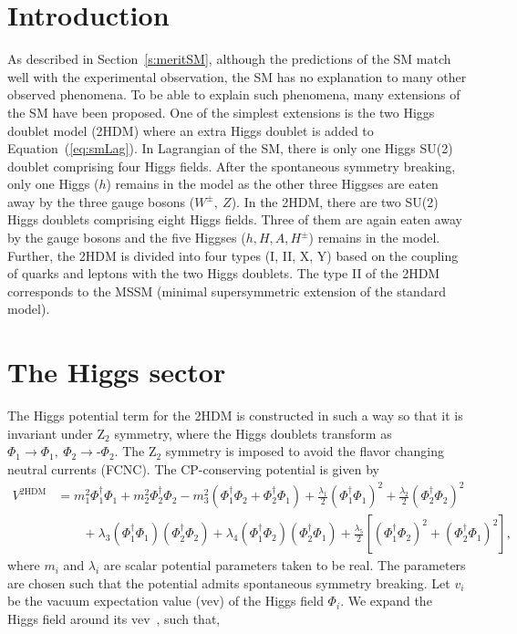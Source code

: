 
\section{Introduction}
\label{s:secIntro2HDM}
As described in Section~\ref{s:meritSM}, although the predictions of the SM 
match well with the experimental observation, the SM has no explanation
to many other observed phenomena. To be able to explain such phenomena, 
many extensions of the SM have been proposed. One of the simplest
extensions is the two Higgs doublet model (2HDM) where an extra Higgs doublet is
added to Equation~(\ref{eq:smLag}). In Lagrangian of the SM, there is only one Higgs SU(2) 
doublet comprising four Higgs fields. After the spontaneous symmetry breaking, 
only one Higgs ($h$) remains in the model as the other three Higgses are eaten 
away by the three gauge bosons ($W^\pm, ~Z$). In the 2HDM, there are two SU(2) 
Higgs doublets comprising eight Higgs fields. Three of them are again 
eaten away by the gauge bosons and the five Higgses ($h, H, A, H^\pm$) remains 
in the model. Further, the 2HDM is divided into four types (I, II, X, Y) based 
on the coupling of quarks and leptons with the two Higgs doublets. The type II
of the 2HDM corresponds to the MSSM (minimal supersymmetric extension of the 
standard model).

\section{The Higgs sector}
The Higgs potential term for the 2HDM is constructed in such a way so that it is 
invariant under Z$_2$ symmetry, where the Higgs doublets transform as 
$\Phi_1 \rightarrow \Phi_1, ~ \Phi_2 \rightarrow \text{-} \Phi_2$. The Z$_2$ symmetry
is imposed to avoid the flavor changing neutral currents (FCNC). The CP-conserving 
potential is given by \cite{PhysRevD.80.015017}
\begin{align}
V^\text{2HDM}
&= m_1^2\Phi_1^\dag\Phi_1+m_2^2\Phi_2^\dag\Phi_2
-m_3^2\left(\Phi_1^\dag\Phi_2+\Phi_2^\dag\Phi_1\right)
+\frac{\lambda_1}2(\Phi_1^\dag\Phi_1)^2
+\frac{\lambda_2}2(\Phi_2^\dag\Phi_2)^2\nonumber \\
&\qquad+\lambda_3(\Phi_1^\dag\Phi_1)(\Phi_2^\dag\Phi_2)
+\lambda_4(\Phi_1^\dag\Phi_2)(\Phi_2^\dag\Phi_1)
+\frac{\lambda_5}2\left[(\Phi_1^\dag\Phi_2)^2
+(\Phi_2^\dag\Phi_1)^2\right], 
\label{eq:pot2HDM}
\end{align}
where $m_i$ and $\lambda_i$ are scalar potential parameters taken to be real. 
The parameters are chosen such that the potential admits spontaneous symmetry breaking. Let $v_i$ be
the vacuum expectation value (vev) of the Higgs field $\Phi_i$. We expand
the Higgs field around its vev~\cite{PhysRevD.80.015017}, such that,

